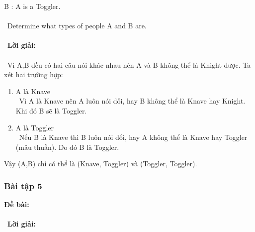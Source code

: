 \documentclass[a4paper]{article}
\begin{document}
B : A is a Toggler.\\\ \\\
Determine what types of people A and B are. \\\ \\\
\textbf{Lời giải:} \\\ \\\
Vì A,B đều có hai câu nói khác nhau nên A và B không thể là Knight được. Ta xét hai trường hợp: 
\begin{enumerate}
\item A là Knave \\\
Vì A là Knave nên A luôn nói dối, hay B không thể là Knave hay Knight. Khi đó B sẽ là Toggler.
\item A là Toggler \\\
Nếu B là Knave thì B luôn nói dối, hay A không thể là Knave hay Toggler (mâu thuẫn). Do đó B là Toggler.
\end{enumerate}
Vậy (A,B) chỉ có thể là (Knave, Toggler) và (Toggler, Toggler).

\clearpage
\subsubsection{Bài tập 5}
\textbf{Đề bài:} 
\\\ \\\
\textbf{Lời giải:} \\\ \\\
\clearpage
\end{document}
